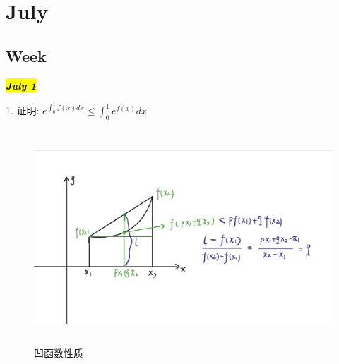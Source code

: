 \chapter{July}
\section{Week }

\hl{\textbf{\textit{July 1}}}

1. 证明: $e^{\int_{0}^{1}f(x)dx}\leq \int_{0}^{1}e^{f(x)}dx$
\begin{figure}[htbp]
	\centering
	\includegraphics[width=15cm,height=8cm]{"figure/Question/凹函数.jpg"}
	\caption{凹函数性质}
	\label{Figure: 凹函数性质}
\end{figure} 

